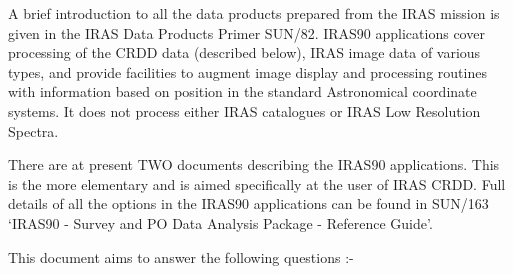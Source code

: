 A brief introduction to all the data products prepared from the IRAS mission
is given in the IRAS Data Products Primer SUN/82. IRAS90 applications cover
processing of the CRDD data (described below), IRAS image data of various types,
and provide facilities to augment image display and processing routines with
information based on position in the standard Astronomical coordinate systems.
It does not process either IRAS catalogues or IRAS Low Resolution Spectra.

There are at present TWO documents describing the IRAS90 applications. This is
the more elementary and is aimed specifically at the user of IRAS CRDD. Full
details of all the options in the IRAS90 applications can be found in SUN/163
`IRAS90 - Survey and PO Data Analysis Package - Reference Guide'.


This document aims to answer the following questions :-

